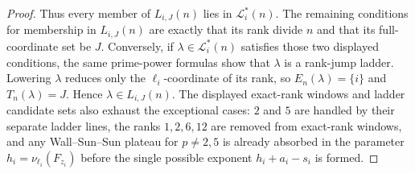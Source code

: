 \begin{proof}
Thus every member of $L_{i,J}(n)$ lies in $\mathcal L_i^*(n)$. The remaining
conditions for membership in $L_{i,J}(n)$ are exactly that its rank divide
$n$ and that its full-coordinate set be $J$. Conversely, if
$\lambda\in\mathcal L_i^*(n)$ satisfies those two displayed conditions, the
same prime-power formulas show that $\lambda$ is a rank-jump ladder. Lowering
$\lambda$ reduces only the $\ell_i$-coordinate of its rank, so
$E_n(\lambda)=\{i\}$ and $T_n(\lambda)=J$. Hence
$\lambda\in L_{i,J}(n)$.
The displayed exact-rank windows and ladder candidate sets also exhaust the
exceptional cases: $2$ and $5$ are handled by their separate ladder lines,
the ranks $1,2,6,12$ are removed from exact-rank windows, and any
Wall--Sun--Sun plateau for $p\ne2,5$ is already absorbed in the parameter
$h_i=\nu_{\ell_i}(F_{z_i})$ before the single possible exponent
$h_i+a_i-s_i$ is formed.
\end{proof}

